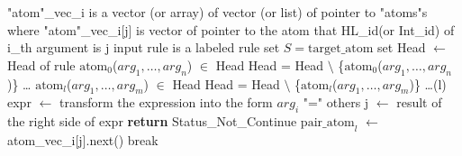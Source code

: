 \begin{algorithm}
    \label{alg:exec_rule}
\begin{algorithmic}[1]
    \scriptsize
    \Require {}
        \State "atom"\_vec\_i is a vector (or array) of vector (or list) of pointer to "atoms"s 
            where "atom"\_vec\_i[j] is vector of pointer to the atom that HL\_id(or Int\_id) of i\_th argument is j
        \State input rule is a labeled rule
        \State set $S = {\text{target\_atom}}$
        \State set Head $\gets$ Head of rule
            \State $\text{atom}_0$($arg_1,\dots, arg_n$) $\in$ Head
            \State Head = Head $\setminus$ \{$\text{atom}_0$($arg_1,\dots, arg_n$)\}
            \State \dots
            \State $\text{atom}_l$($arg_1,\dots, arg_m$) $\in$ Head
            \State Head = Head $\setminus$ \{$\text{atom}_l$($arg_1,\dots, arg_m$)\}    
       \Loop
            \State \dots (l)
            \Loop
                    \State expr $\gets$ transform the expression into the form $arg_i$ "=" others  
                    \State j $\gets$ result of the right side of expr  
                        \State \textbf{return} Status\_Not\_Continue
                    \Else
                        \State $\text{pair\_atom}_l$ $\gets$ atom\_vec\_i[j].next()
                            \State break
                        \EndIf
                    \EndIf

\end{algorithmic}
\end{algorithm}
